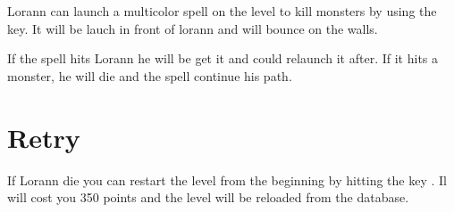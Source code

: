 \documentclass{report}
\begin{document}
Lorann can launch a multicolor spell on the level to kill monsters by using the  key. It will be lauch in front of lorann and will bounce on the walls.

If the spell hits Lorann he will be get it and could relaunch it after. If it hits a monster, he will die and the spell continue his path.

\section{Retry}

If Lorann die you can restart the level from the beginning by hitting the key . Il will cost you 350 points and the level will be reloaded from the database.
\end{document}
